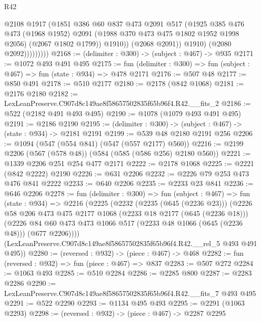 \begin{lexlean}{R42}
\begin{coremodule}
                          @2108
                          @1917
                          (@1851
                            @386
                            @60
                            @837
                            @473
                            @2091
                            @517
                            (@1925
                              @385
                              @476
                              @473
                              (@1968 @1952)
                              @2091
                              (@1988 @370 @473 @475 @1802 @1952 @1998 @2056)
                              (@2067 @1802 @1799))
                            @1910))
                        (@2068 @2091))
                      @1910)
                    (@2080 @2092)))))))))
@2168 := (delimiter : @300) -> (subject : @467) -> @935
@2171 := @1072 @493 @491 @495
@2175 := fun (delimiter : @300) => fun (subject : @467) => fun (state : @934) => @478 @2171
@2176 := @507 @48
@2177 := @850 @491
@2178 := @510 @2177
@2180 := @2178 (@842 @1068)
@2181 := @2176 @2180
@2182 := LexLeanPreserve.C907d8c149ae8f58657502835f65b96f4.R42.__fits_2
@2186 := @522 (@2182 @491 @493 @495)
@2190 := @1078 (@1079 @493 @491 @495)
@2191 := @2186 @2190
@2195 := (delimiter : @300) -> (subject : @467) -> (state : @934) -> @2181 @2191
@2199 := @539 @48 @2180 @2191 @256
@2206 := @1094 (@547 (@554 @841) (@547 (@557 @2177) @560))
@2216 := @2199 @2206 (@567 (@578 @48)) (@584 (@585 (@586 @256) @2180 @560))
@2221 := @1339 @2206 @251 @254 @477 @2171
@2222 := @2178 @1068
@2225 := @2221 (@842 @2222) @2190
@2226 := @631 @2206
@2232 := @2226 @79 @253 @473 @476 @841 @2222
@2233 := @640 @2206
@2235 := @2233 @23 @841
@2236 := @646 @2206
@2278 := fun (delimiter : @300) =>
  fun (subject : @467) =>
  fun (state : @934) =>
  @2216
    (@2225
      (@2232
        (@2235 (@645 (@2236 @23)))
        (@2226
          @58
          @206
          @473
          @475
          @2177
          @1068
          (@2233 @18 @2177 (@645 (@2236 @18)))
          (@2226 @84 @60 @473 @473 @1066 @517 (@2233 @48 @1066 (@645 (@2236 @48))) (@677 @2206))))
      (LexLeanPreserve.C907d8c149ae8f58657502835f65b96f4.R42.__rel_5 @493 @491 @495))
@2280 := (reversed : @932) -> (piece : @467) -> @468
@2282 := fun (reversed : @932) => fun (piece : @467) => @837
@2283 := @507 @272
@2284 := @1063 @493
@2285 := @510 @2284
@2286 := @2285 @800
@2287 := @2283 @2286
@2290 := LexLeanPreserve.C907d8c149ae8f58657502835f65b96f4.R42.__fits_7 @493 @495
@2291 := @522 @2290
@2293 := @1134 @495 @493
@2295 := @2291 (@1063 @2293)
@2298 := (reversed : @932) -> (piece : @467) -> @2287 @2295

\end{coremodule}
\end{lexlean}
